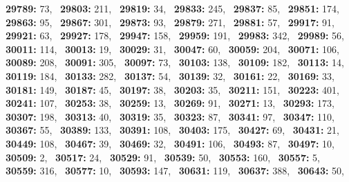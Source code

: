 \textbf{29789:} 73,\allowbreak~ 
\textbf{29803:} 211,\allowbreak~ 
\textbf{29819:} 34,\allowbreak~ 
\textbf{29833:} 245,\allowbreak~ 
\textbf{29837:} 85,\allowbreak~ 
\textbf{29851:} 174,\allowbreak~ 
\textbf{29863:} 95,\allowbreak~ 
\textbf{29867:} 301,\allowbreak~ 
\textbf{29873:} 93,\allowbreak~ 
\textbf{29879:} 271,\allowbreak~ 
\textbf{29881:} 57,\allowbreak~ 
\textbf{29917:} 91,\allowbreak~ 
\textbf{29921:} 63,\allowbreak~ 
\textbf{29927:} 178,\allowbreak~ 
\textbf{29947:} 158,\allowbreak~ 
\textbf{29959:} 191,\allowbreak~ 
\textbf{29983:} 342,\allowbreak~ 
\textbf{29989:} 56,\allowbreak~ 
\textbf{30011:} 114,\allowbreak~ 
\textbf{30013:} 19,\allowbreak~ 
\textbf{30029:} 31,\allowbreak~ 
\textbf{30047:} 60,\allowbreak~ 
\textbf{30059:} 204,\allowbreak~ 
\textbf{30071:} 106,\allowbreak~ 
\textbf{30089:} 208,\allowbreak~ 
\textbf{30091:} 305,\allowbreak~ 
\textbf{30097:} 73,\allowbreak~ 
\textbf{30103:} 138,\allowbreak~ 
\textbf{30109:} 182,\allowbreak~ 
\textbf{30113:} 14,\allowbreak~ 
\textbf{30119:} 184,\allowbreak~ 
\textbf{30133:} 282,\allowbreak~ 
\textbf{30137:} 54,\allowbreak~ 
\textbf{30139:} 32,\allowbreak~ 
\textbf{30161:} 22,\allowbreak~ 
\textbf{30169:} 33,\allowbreak~ 
\textbf{30181:} 149,\allowbreak~ 
\textbf{30187:} 45,\allowbreak~ 
\textbf{30197:} 38,\allowbreak~ 
\textbf{30203:} 35,\allowbreak~ 
\textbf{30211:} 151,\allowbreak~ 
\textbf{30223:} 401,\allowbreak~ 
\textbf{30241:} 107,\allowbreak~ 
\textbf{30253:} 38,\allowbreak~ 
\textbf{30259:} 13,\allowbreak~ 
\textbf{30269:} 91,\allowbreak~ 
\textbf{30271:} 13,\allowbreak~ 
\textbf{30293:} 173,\allowbreak~ 
\textbf{30307:} 198,\allowbreak~ 
\textbf{30313:} 40,\allowbreak~ 
\textbf{30319:} 35,\allowbreak~ 
\textbf{30323:} 87,\allowbreak~ 
\textbf{30341:} 97,\allowbreak~ 
\textbf{30347:} 110,\allowbreak~ 
\textbf{30367:} 55,\allowbreak~ 
\textbf{30389:} 133,\allowbreak~ 
\textbf{30391:} 108,\allowbreak~ 
\textbf{30403:} 175,\allowbreak~ 
\textbf{30427:} 69,\allowbreak~ 
\textbf{30431:} 21,\allowbreak~ 
\textbf{30449:} 108,\allowbreak~ 
\textbf{30467:} 39,\allowbreak~ 
\textbf{30469:} 32,\allowbreak~ 
\textbf{30491:} 106,\allowbreak~ 
\textbf{30493:} 87,\allowbreak~ 
\textbf{30497:} 10,\allowbreak~ 
\textbf{30509:} 2,\allowbreak~ 
\textbf{30517:} 24,\allowbreak~ 
\textbf{30529:} 91,\allowbreak~ 
\textbf{30539:} 50,\allowbreak~ 
\textbf{30553:} 160,\allowbreak~ 
\textbf{30557:} 5,\allowbreak~ 
\textbf{30559:} 316,\allowbreak~ 
\textbf{30577:} 10,\allowbreak~ 
\textbf{30593:} 147,\allowbreak~ 
\textbf{30631:} 119,\allowbreak~ 
\textbf{30637:} 388,\allowbreak~ 
\textbf{30643:} 50,\allowbreak~ 
